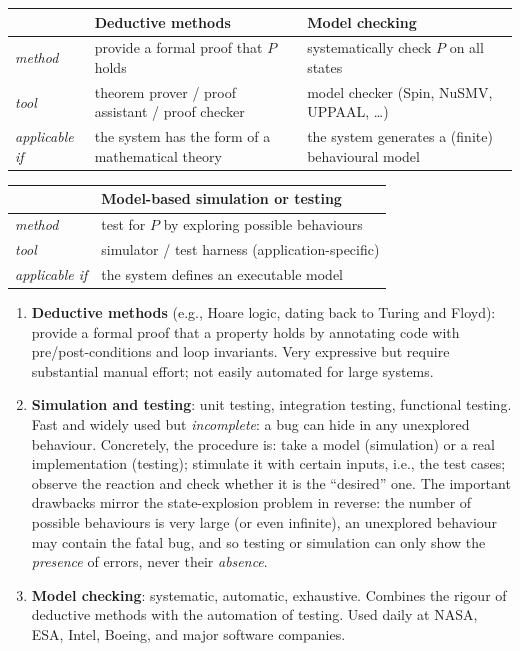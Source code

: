 \begin{center}
  \renewcommand{\arraystretch}{1.3}
  \begin{tabular}{p{2.5cm} p{4.55cm} p{4.55cm}}
    \toprule
    & \textbf{Deductive methods} & \textbf{Model checking} \\
    \midrule
    \emph{method} & provide a formal proof that $P$ holds &
      systematically check $P$ on all states \\
    \emph{tool} & theorem prover / proof assistant / proof checker &
      model checker (Spin, NuSMV, UPPAAL, \ldots) \\
    \emph{applicable if} & the system has the form of a mathematical
      theory & the system generates a (finite) behavioural model \\
    \bottomrule
  \end{tabular}

  \medskip
  \begin{tabular}{p{2.6cm} p{9.5cm}}
    \toprule
    & \textbf{Model-based simulation or testing} \\
    \midrule
    \emph{method} & test for $P$ by exploring possible behaviours \\
    \emph{tool} & simulator / test harness (application-specific) \\
    \emph{applicable if} & the system defines an executable model \\
    \bottomrule
  \end{tabular}
\end{center}

\begin{enumerate}
  \item \textbf{Deductive methods} (e.g., Hoare logic, dating back to
        Turing and Floyd): provide a formal proof that a property holds by
        annotating code with pre/post-conditions and loop invariants.  Very
        expressive but require substantial manual effort; not easily
        automated for large systems.
  \item \textbf{Simulation and testing}: unit testing, integration testing,
        functional testing.  Fast and widely used but \emph{incomplete}: a
        bug can hide in any unexplored behaviour.  Concretely, the
        procedure is: take a model (simulation) or a real implementation
        (testing); stimulate it with certain inputs, i.e., the test cases;
        observe the reaction and check whether it is the ``desired'' one.
        The important drawbacks mirror the state-explosion problem in
        reverse: the number of possible behaviours is very large (or even
        infinite), an unexplored behaviour may contain the fatal bug, and
        so testing or simulation can only show the \emph{presence} of
        errors, never their \emph{absence}.
  \item \textbf{Model checking}: systematic, automatic, exhaustive.
        Combines the rigour of deductive methods with the automation of
        testing.  Used daily at NASA, ESA, Intel, Boeing, and major software
        companies.
\end{enumerate}

